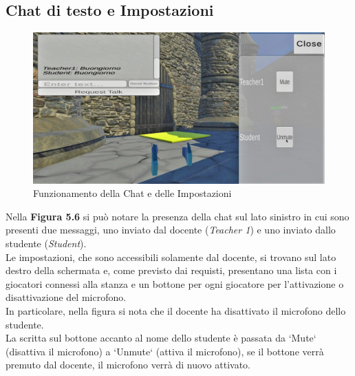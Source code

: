 \subsection{Chat di testo e Impostazioni}
\begin{figure}[H]
\centering
\includegraphics[scale = 0.25]{Immagini/Dimostrazioni d'uso/impostazioni.jpg}
\caption{Funzionamento della Chat e delle Impostazioni}
\end{figure}
Nella \textbf{Figura 5.6} si può notare la presenza della chat sul lato sinistro in cui sono presenti due messaggi, uno inviato dal docente (\textit{Teacher 1}) e uno inviato dallo studente (\textit{Student}).
\\Le impostazioni, che sono accessibili solamente dal docente, si trovano sul lato destro della schermata e, come previsto dai requisti, presentano una lista con i giocatori connessi alla stanza e un bottone per ogni giocatore per l'attivazione o disattivazione del microfono.
\\In particolare, nella figura si nota che il docente ha disattivato il microfono dello studente.
\\La scritta sul bottone accanto al nome dello studente è passata da `Mute` (disattiva il microfono) a `Unmute` (attiva il microfono), se il bottone verrà premuto dal docente, il microfono verrà di nuovo attivato.
